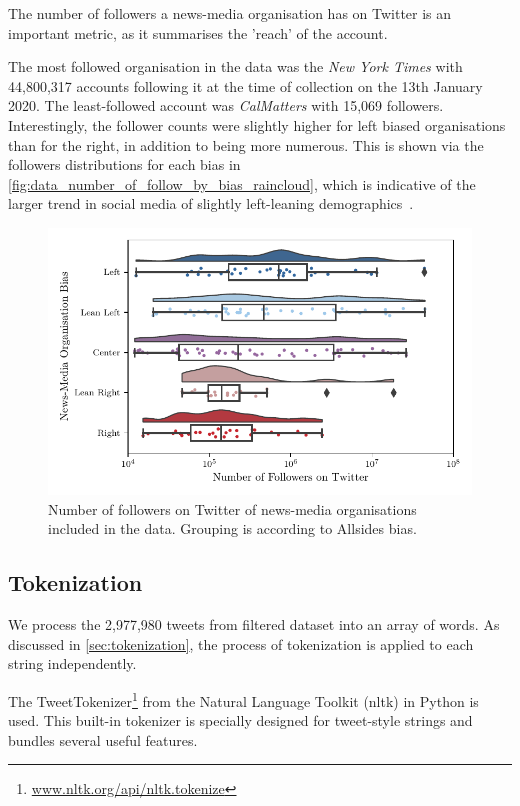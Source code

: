 The number of followers a news-media organisation has on Twitter is an important metric, as it summarises the 'reach' of the account.

The most followed organisation in the data was the \emph{New York Times} with 44,800,317 accounts following it at the time of collection on the 13th January 2020. The least-followed account was \emph{CalMatters} with 15,069 followers. Interestingly, the follower counts were slightly higher for left biased organisations than for the right, in addition to being more numerous. This is shown via the followers distributions for each bias in \autoref{fig:data_number_of_follow_by_bias_raincloud}, which is indicative of the larger trend in social media of slightly left-leaning demographics~\cite{mellonTwitterFacebookAre2017}.

\begin{figure}[!htbp]
	\centering
	\includegraphics[width=\textwidth]{chapter1/figs/number_of_follow_by_bias_raincloud}
	\caption{Number of followers on Twitter of news-media organisations included in the data. Grouping is according to Allsides bias.}
	\label{fig:data_number_of_follow_by_bias_raincloud}
\end{figure}

\subsection{Tokenization}

We process the 2,977,980 tweets from filtered dataset into an array of words. As discussed in \autoref{sec:tokenization}, the process of tokenization is applied to each string independently.

The TweetTokenizer\footnote{\url{www.nltk.org/api/nltk.tokenize}} from the Natural Language Toolkit (nltk) in Python is used. This built-in tokenizer is specially designed for tweet-style strings and bundles several useful features.

